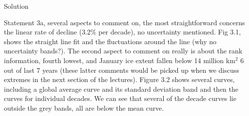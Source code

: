 \documentclass[
  letterpaper,
  DIV=11,
  numbers=noendperiod,
  oneside]{scrartcl}
\begin{document}
\begin{tcolorbox}
Solution

Statement 3a, several aspects to comment on, the most straightforward
concerns the linear rate of decline (3.2\% per decade), no uncertainty
mentioned. Fig 3.1, shows the straight line fit and the fluctuations
around the line (why no uncertainty bands?). The second aspect to
comment on really is about the rank information, fourth lowest, and
January ice extent fallen below 14 million km\(^2\) 6 out of last 7
years (these latter comments would be picked up when we discuss extremes
in the next section of the lectures). Figure 3.2 shows several curves,
including a global average curve and its standard deviation band and
then the curves for individual decades. We can see that several of the
decade curves lie outside the grey bands, all are below the mean curve.

\end{tcolorbox}
\end{document}
